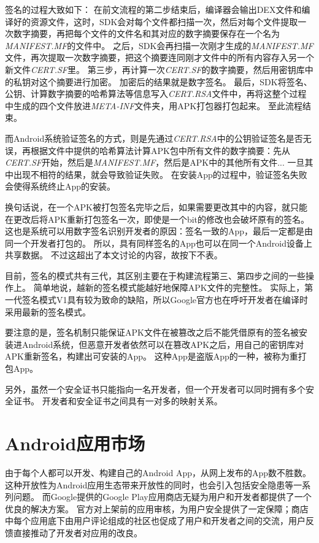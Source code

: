 签名的过程大致如下：
在前文流程的第二步结束后，编译器会输出DEX文件和编译好的资源文件，这时，SDK会对每个文件都扫描一次，然后对每个文件提取一次数字摘要，再把每个文件的文件名和其对应的数字摘要保存在一个名为\textit{MANIFEST.MF}的文件中。
之后，SDK会再扫描一次刚才生成的\textit{MANIFEST.MF}文件，再次提取一次数字摘要，把这个摘要连同刚才文件中的所有内容存入另一个新文件\textit{CERT.SF}里。
第三步，再计算一次\textit{CERT.SF}的数字摘要，然后用密钥库中的私钥对这个摘要进行加密。
加密后的结果就是数字签名。
最后，SDK将签名、公钥、计算数字摘要的哈希算法等信息写入\textit{CERT.RSA}文件中，再将这整个过程中生成的四个文件放进\textit{META-INF}文件夹，用APK打包器打包起来。
至此流程结束。

而Android系统验证签名的方式，则是先通过\textit{CERT.RSA}中的公钥验证签名是否无误，再根据文件中提供的哈希算法计算APK包中所有文件的数字摘要：先从\textit{CERT.SF}开始，然后是\textit{MANIFEST.MF}，然后是APK中的其他所有文件...
一旦其中出现不相符的结果，就会导致验证失败。
在安装App的过程中，验证签名失败会使得系统终止App的安装。

换句话说，在一个APK被打包签名完毕之后，如果需要更改其中的内容，就只能在更改后将APK重新打包签名一次，即使是一个bit的修改也会破坏原有的签名。
这也是系统可以用数字签名识别开发者的原因：签名一致的App，最后一定都是由同一个开发者打包的。
所以，具有同样签名的App也可以在同一个Android设备上共享数据。
不过这超出了本文讨论的内容，故按下不表。

目前，签名的模式共有三代，其区别主要在于构建流程第三、第四步之间的一些操作上。
简单地说，越新的签名模式能越好地保障APK文件的完整性。
实际上，第一代签名模式V1具有较为致命的缺陷，所以Google官方也在呼吁开发者在编译时采用最新的签名模式。

要注意的是，签名机制只能保证APK文件在被篡改之后不能凭借原有的签名被安装进Android系统，但恶意开发者依然可以在篡改APK之后，用自己的密钥库对APK重新签名，构建出可安装的App。
这种App是盗版App的一种，被称为重打包App。

另外，虽然一个安全证书只能指向一名开发者，但一个开发者可以同时拥有多个安全证书。
开发者和安全证书之间具有一对多的映射关系。

\section{Android应用市场}
\label{sec:androidMkt}

由于每个人都可以开发、构建自己的Android App，从网上发布的App数不胜数。这种开放性为Android应用生态带来开放性的同时，也会引入包括安全隐患等一系列问题。
而Google提供的Google Play应用商店无疑为用户和开发者都提供了一个优良的解决方案。
官方对上架前的应用审核，为用户安全提供了一定保障；商店中每个应用底下由用户评论组成的社区也促成了用户和开发者之间的交流，用户反馈直接推动了开发者对应用的改良。

